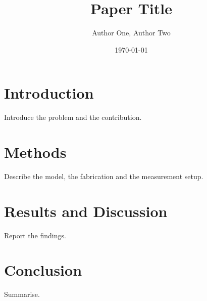 \documentclass[11pt,a4paper,twocolumn]{article}
\title{Paper Title}
\author{Author One, Author Two}
\date{\today}
\begin{document}
\makeatletter
{}
\makeatother

\section{Introduction}
\label{sec:intro}

Introduce the problem and the contribution.


\section{Methods}
\label{sec:methods}

Describe the model, the fabrication and the measurement setup.

\section{Results and Discussion}
\label{sec:results}

Report the findings.

\section{Conclusion}
\label{sec:conclusion}

Summarise.

\printbibliography
\end{document}
